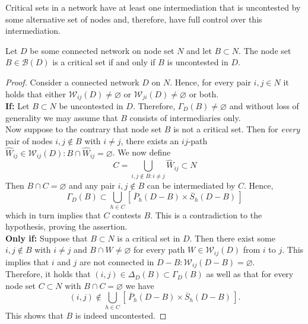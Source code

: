 Critical sets in a network have at least one intermediation that is uncontested by some alternative set of nodes and, therefore, have full control over this intermediation.
\begin{theorem} \label{thm:blockduality}
Let $D$ be some connected network on node set $N$ and let $B \subset N$. The node set $B \in \mathcal{B} (D)$ is a critical set if and only if $B$ is uncontested in $D$.
\end{theorem}
\begin{proof}
Consider a connected network $D$ on $N$. Hence, for every pair $i,j \in N$ it holds that either $\mathcal{W}_{ij} (D) \neq \varnothing$ or $\mathcal{W}_{ji} (D) \neq \varnothing$ or both.
\\[1ex]
\textbf{If:} Let $B \subset N$ be uncontested in $D$. Therefore, $\Gamma_D(B) \neq \varnothing$ and without loss of generality we may assume that $B$ consists of intermediaries only.
\\
Now suppose to the contrary that node set $B$ is not a critical set. Then for \emph{every} pair of nodes $i,j \notin B$ with $i \neq j$, there exists an $ij$-path $\widehat{W}_{ij} \in \mathcal{W}_{ij} (D) \colon B \cap \widehat{W}_{ij} = \varnothing$. We now define
\begin{equation}
C = \bigcup_{i,j \notin B \colon i \neq j} \widehat{W}_{ij} \subset N
\end{equation}
Then $B \cap C = \varnothing$ and any pair $i,j \notin B$ can be intermediated by $C$. Hence,
\[
\Gamma_D (B) \subset \bigcup_{h \in C} \left[ \, \overline{P}_h (D-B) \times \overline{S}_h (D-B) \, \right]
\]
which in turn implies that $C$ contests $B$. This is a contradiction to the hypothesis, proving the assertion.
\\[1ex]
\textbf{Only if:} Suppose that $B \subset N$ is a critical set in $D$. Then there exist some $i,j \notin B$ with $i \neq j$ and $B \cap W \neq \varnothing$ for every path $W \in \mathcal{W}_{ij} (D)$ from $i$ to $j$. This implies that $i$ and $j$ are not connected in $D-B \colon \mathcal{W}_{ij} (D-B) = \varnothing$.
\\
Therefore, it holds that $(i,j) \in \Delta_D (B) \subset \Gamma_D (B)$ as well as that for every node set $C \subset N$ with $B \cap C = \varnothing$ we have
\[
(i,j) \notin \bigcup_{h \in C} \left[ \, \overline{P}_h (D-B) \times \overline{S}_h (D-B) \, \right] .
\]
This shows that $B$ is indeed uncontested.
\end{proof}

